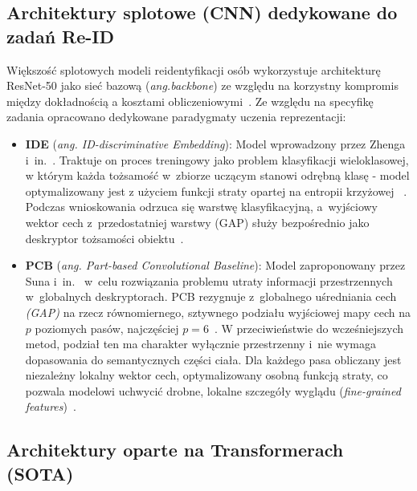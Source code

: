 \subsection{Architektury splotowe (CNN) dedykowane do zadań Re-ID}
\label{subsec:cnn_reid}

Większość splotowych modeli reidentyfikacji osób wykorzystuje architekturę ResNet-50 jako sieć
bazową (\textit{ang.backbone}) ze względu na korzystny kompromis między dokładnością a kosztami
obliczeniowymi~\cite{ristani2016, zheng2016person}. Ze względu na specyfikę zadania opracowano
dedykowane paradygmaty uczenia reprezentacji:
\begin{itemize}
  \item \textbf{IDE} (\textit{ang. ID-discriminative Embedding}): Model wprowadzony przez Zhenga i~in.~\cite{zheng2017wild}. Traktuje on proces treningowy jako problem klasyfikacji wieloklasowej, w którym każda tożsamość w~zbiorze uczącym stanowi odrębną klasę - model optymalizowany jest z użyciem funkcji straty opartej na entropii krzyżowej ~\cite{zheng2017wild}. Podczas wnioskowania odrzuca się warstwę klasyfikacyjną, a~wyjściowy wektor cech z~przedostatniej warstwy (GAP) służy bezpośrednio jako deskryptor tożsamości obiektu~\cite{zheng2017wild}.
  \item \textbf{PCB} (\textit{ang. Part-based Convolutional Baseline}): Model zaproponowany przez Suna i~in.~\cite{sun2018beyond} w~celu rozwiązania problemu utraty informacji przestrzennych w~globalnych deskryptorach. PCB rezygnuje z~globalnego uśredniania cech \textit{(GAP)} na rzecz równomiernego, sztywnego podziału wyjściowej mapy cech na $p$ poziomych pasów, najczęściej $p=6$~\cite{sun2018beyond}. W przeciwieństwie do wcześniejszych metod, podział ten ma charakter wyłącznie przestrzenny i~nie wymaga dopasowania do semantycznych części ciała. Dla każdego pasa obliczany jest niezależny lokalny wektor cech, optymalizowany osobną funkcją straty, co pozwala modelowi uchwycić drobne, lokalne szczegóły wyglądu (\textit{fine-grained features})~\cite{sun2018beyond}.
\end{itemize}

\subsection{Architektury oparte na Transformerach (SOTA)}
\label{subsec:transformers_reid}

